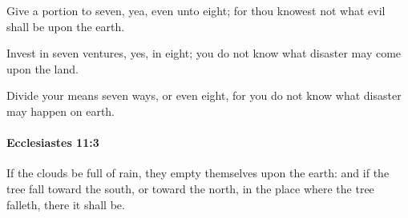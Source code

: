 			\begin{versebox}
					\item[BHS] 
					\item[LXX] 
					\item[ASV] Give a portion to seven, yea, even unto eight; for thou knowest not what evil shall be upon the earth.
					\item[NIV] Invest in seven ventures, yes, in eight; you do not know what disaster may come upon the land.
					\item[NRSV] Divide your means seven ways, or even eight, for you do not know what disaster may happen on earth.
			\end{versebox}

		\paragraph{Ecclesiastes 11:3} %
			\label{ECCLESIASTES-11-3}

			If the clouds be full of rain, they empty themselves upon the earth: and if the tree fall toward the south, or toward the north, in the place where the tree falleth, there it shall be.

